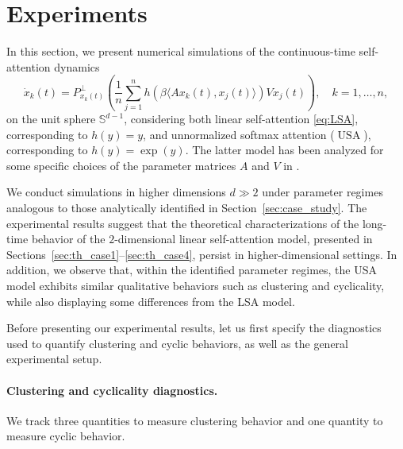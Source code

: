 \documentclass[10pt]{article}
\theoremstyle{definition}
\theoremstyle{definition}
\numberwithin{equation}{section}
\newcommand{\BBS}{\mathbb{S}}
\begin{document}
\section{Experiments}
\label{sec:experiments}
In this section, we present numerical simulations of the continuous-time self-attention dynamics
\begin{equation}
    \dot{x}_k(t) = P^\perp_{x_k(t)}\!\left(\frac{1}{n}\sum_{j=1}^n h\!\left(\beta\langle Ax_k(t), x_j(t)\rangle\right) V x_j(t)\right), \quad k = 1,\dots,n,
\end{equation}
on the unit sphere $\BBS^{d-{1}}$,
considering both linear self-attention \eqref{eq:LSA}, corresponding to $h(y) = y$, and
unnormalized softmax attention ($\operatorname{USA}$), corresponding to $h(y) = \exp(y)$.
The latter model has
been analyzed for some specific choices of the parameter matrices $A$ and $V$ in \cite{geshkovski2023mathematical,geshkovski2024dynamic,chen2025quantitative,abella2024asymptotic,abella2025consensus,altafini2026multistability}.
 
We conduct simulations in higher dimensions $d \gg 2$ under parameter regimes analogous to those analytically identified in Section~\ref{sec:case_study}.
The experimental results suggest that the theoretical characterizations of the long-time behavior of the $2$-dimensional linear self-attention model, presented in Sections~\ref{sec:th_case1}--\ref{sec:th_case4}, persist in higher-dimensional settings. 
In addition, we observe that, within the identified parameter regimes, the USA model exhibits similar qualitative behaviors such as clustering and cyclicality, while also displaying some differences from the LSA model.


Before presenting our experimental results, let us first specify the diagnostics used to quantify clustering and cyclic behaviors, as well as the general experimental setup.

\paragraph{Clustering and cyclicality diagnostics.}
We track three quantities to measure clustering behavior and one quantity to measure cyclic behavior.
\end{document}
